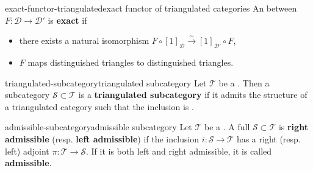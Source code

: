 \begin{topic}{exact-functor-triangulated}{exact functor of triangulated categories}
    An  between  $F \colon \mathcal{D} \to \mathcal{D}'$ is \textbf{exact} if
    \begin{itemize}
        \item there exists a natural isomorphism $F \circ [1]_\mathcal{D} \xrightarrow{\sim} [1]_{\mathcal{D}'} \circ F$,
        \item $F$ maps distinguished triangles to distinguished triangles.
    \end{itemize}
\end{topic}

\begin{topic}{triangulated-subcategory}{triangulated subcategory}
    Let $\mathcal{T}$ be a . Then a subcategory $\mathcal{S} \subset \mathcal{T}$ is a \textbf{triangulated subcategory} if it admits the structure of a triangulated category such that the inclusion is .
\end{topic}

\begin{topic}{admissible-subcategory}{admissible subcategory}
    Let $\mathcal{T}$ be a . A full  $\mathcal{S} \subset \mathcal{T}$ is \textbf{right admissible} (resp. \textbf{left admissible}) if the inclusion $i \colon \mathcal{S} \to \mathcal{T}$ has a right (resp. left) adjoint $\pi \colon \mathcal{T} \to \mathcal{S}$. If it is both left and right admissible, it is called \textbf{admissible}.
\end{topic}

